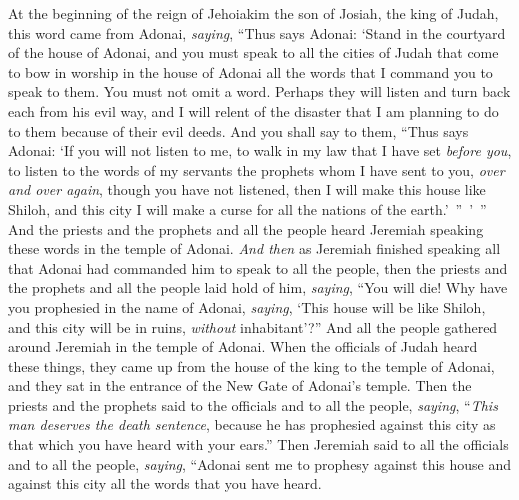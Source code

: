\begin{biblechapter} %
 At the beginning of the reign of Jehoiakim the son of Josiah, the king of Judah, this word came from Adonai, \textit{saying},
\verse “Thus says Adonai: ‘Stand in the courtyard of the house of Adonai, and you must speak to all the cities of Judah that come to bow in worship in the house of Adonai all the words that I command you to speak to them. You must not omit a word.
\verse Perhaps they will listen and turn back each from his evil way, and I will relent of the disaster that I am planning to do to them because of their evil deeds.
\verse And you shall say to them, “Thus says Adonai: ‘If you will not listen to me, to walk in my law that I have set \textit{before you},
\verse to listen to the words of my servants the prophets whom I have sent to you, \textit{over and over again}, though you have not listened,
\verse then I will make this house like Shiloh, and this city I will make a curse for all the nations of the earth.’ ” ’ ”
\verse And the priests and the prophets and all the people heard Jeremiah speaking these words in the temple of Adonai.
\verse \textit{And then} as Jeremiah finished speaking all that Adonai had commanded him to speak to all the people, then the priests and the prophets and all the people laid hold of him, \textit{saying}, “You will die!
\verse Why have you prophesied in the name of Adonai, \textit{saying}, ‘This house will be like Shiloh, and this city will be in ruins, \textit{without} inhabitant’?” And all the people gathered around Jeremiah in the temple of Adonai.
\verse When the officials of Judah heard these things, they came up from the house of the king to the temple of Adonai, and they sat in the entrance of the New Gate of Adonai’s temple.
\verse Then the priests and the prophets said to the officials and to all the people, \textit{saying}, “\textit{This man deserves the death sentence}, because he has prophesied against this city as that which you have heard with your ears.”
\verse Then Jeremiah said to all the officials and to all the people, \textit{saying}, “Adonai sent me to prophesy against this house and against this city all the words that you have heard.

\end{biblechapter}
